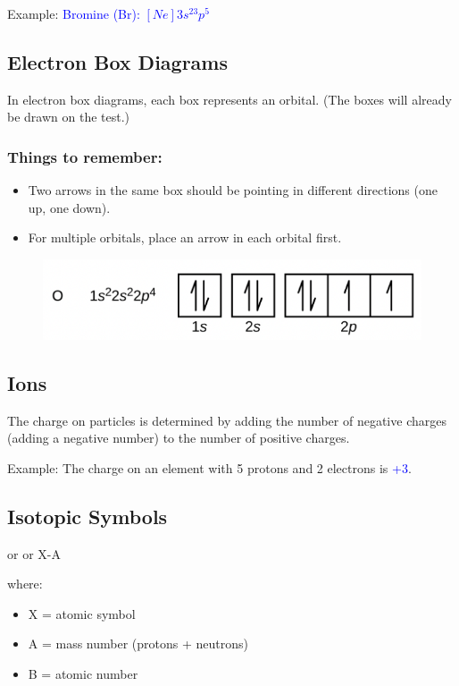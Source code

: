 \documentclass[a4paper, 12pt]{article}
\begin{document}
Example: \textcolor{blue}{Bromine (Br): $[Ne]3s^23p^5$}

\subsection*{Electron Box Diagrams}
In electron box diagrams, each box represents an orbital. (The boxes will already be drawn on the test.)
\subsubsection*{Things to remember:}
\begin{itemize}[leftmargin=*, nosep]
    \item Two arrows in the same box should be pointing in different directions (one up, one down).
    \item For multiple orbitals, place an arrow in each orbital first.
\end{itemize}

\begin{figure}[ht]
    \centering
    \includegraphics[width=0.5\linewidth]{electronboxdiagrams.png}
    \label{fig:4}
\end{figure}

\subsection*{Ions}
The charge on particles is determined by adding the number of negative charges (adding a negative number) to the number of positive charges.
 
Example: The charge on an element with 5 protons and 2 electrons is \textcolor{blue}{+3}.

\subsection*{Isotopic Symbols}
 or  or X-A
 
where:
\begin{itemize}[leftmargin=*, nosep]
    \item X = atomic symbol
    \item A = mass number (protons + neutrons)
    \item B = atomic number
\end{itemize}
\end{document}
